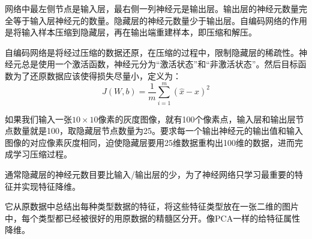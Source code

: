 \documentclass[openbib]{article}
\begin{document}
网络中最左侧节点是输入层，最右侧一列神经元是输出层。输出层的神经元数量完全等于输入层神经元的数量。隐藏层的神经元数量少于输出层。自编码网络的作用是将输入样本压缩到隐藏层，再在输出端重建样本，即压缩和解压。

自编码网络是将经过压缩的数据还原，在压缩的过程中，限制隐藏层的稀疏性。神经元总是使用一个激活函数，神经元分为“激活状态”和“非激活状态”。然后目标函数为了还原数据应该使得损失尽量小，定义为：
$$
J(W,b)=\frac{1}{m}\sum_{i=1}^{m}\left( \hat{x}-x \right)^2
$$

如果我们输入一张$10\times10$像素的灰度图像，就有100个像素点，输入层和输出层节点数量就是100，取隐藏层节点数量为25。要求每一个输出神经元的输出值和输入图像的对应像素灰度相同，迫使隐藏层要用25维数据重构出100维的数据，进而完成学习压缩过程。

通常隐藏层的神经元数目要比输入/输出层的少，为了神经网络只学习最重要的特征并实现特征降维。

它从原数据中总结出每种类型数据的特征，将这些特征类型放在一张二维的图片中，每个类型都已经被很好的用原数据的精髓区分开。像PCA一样的给特征属性降维。
\end{document}

